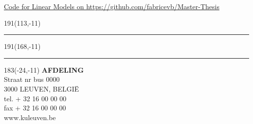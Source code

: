 \documentclass[12pt,a4paper,oneside]{book}
\begin{document}
\href{https://github.com/fabricevb/Master-Thesis/blob/master/R%20Code/Linear%20Regression.R}{Code for Linear Models on https://github.com/fabricevb/Master-Thesis}



\newpage

\thispagestyle{empty}
\sffamily
%
\begin{textblock}{191}(113,-11)
{\color{blueline}\rule{160pt}{5.5pt}}
\end{textblock}
%
\begin{textblock}{191}(168,-11)
{\color{blueline}\rule{5.5pt}{59pt}}
\end{textblock}
%
\begin{textblock}{183}(-24,-11)
\textblockcolour{}
\flushright
\fontsize{7}{7.5}\selectfont
\textbf{AFDELING}\\
Straat nr bus 0000\\
3000 LEUVEN, BELGI\"{E}\\
tel. + 32 16 00 00 00\\
fax + 32 16 00 00 00\\
www.kuleuven.be\\
\end{textblock}
%
\end{document}

